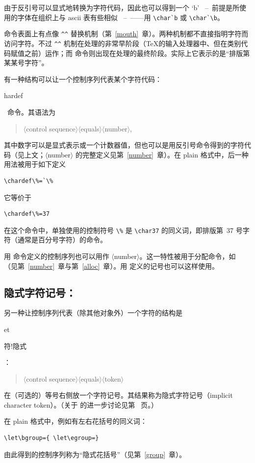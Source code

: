 \documentclass[a4paper]{rapport3}
\makeatletter
\def\gr#1{$\langle$#1$\rangle$}\def\key#1{{\tt#1}}
\def\ldash{\unskip\ --\nobreak\ \ignorespaces}
\def\rdash{\unskip\nobreak\ --\ \ignorespaces}
\def\ascii{{\sc ascii}}
\newenvironment{disp}{\begin{quotation}}{\end{quotation}}
\def\gram#1{\gr{#1}}%
\def\term#1\par{\index{#1}}
\def\cstoidx#1\par{\index{#1@\cs{#1}}}
\makeatother
\begin{document}
由于反引号可以显式地转换为字符代码，因此也可以得到一个 `b' \ldash 前提是所使用的字体在组织上与 \ascii{} 表有些相似 \rdash——用 \verb.\char`b. 或 \verb.\char`\b.。

 命令表面上有点像 \verb-^^- 替换机制（第~\ref{mouth}~章）。两种机制都不直接指明字符而访问字符。不过 \verb-^^- 机制在处理的非常早阶段（\TeX 的输入处理器中、但在类别代码赋值之前）运作；而  命令则出现在处理的最终阶段。实际上它表示的是“排版第某某号字符”。
\awp

有一种结构可以让一个控制序列代表某个字符代码：\cstoidx chardef\par\ 命令。其语法为 \label{chardef}
\begin{disp}\gram{control sequence}\gr{equals}\gram{number},
\end{disp}
其中数字可以是显式表示或一个计数器值，但也可以是用反引号命令得到的字符代码（见上文；\gr{number} 的完整定义见第~\ref{number}~章）。在 plain 格式中，后一种用法被用于如下定义
\begin{verbatim}
\chardef\%=`\%
\end{verbatim}
它等价于
\begin{verbatim}
\chardef\%=37
\end{verbatim}
在这个命令中，单独使用的控制符号 \verb>\%> 是 \verb>\char37> 的同义词，即排版第~37 号字符（通常是百分号字符）的命令。

用  命令定义的控制序列也可以用作 \gr{number}。这一特性被用于分配命令，如 （见第~\ref{number}~章与第~\ref{alloc}~章）。用  定义的记号也可以这样使用。

\subsection{隐式字符记号：\protect{}}

另一种让控制序列代表（除其他对象外）一个字符的结构是~\cstoidx let\par
\term 字符!隐式\par：
\begin{disp}\gr{control sequence}\gr{equals}\gr{token}\end{disp}
在（可选的）等号右侧放一个字符记号。其结果称为隐式字符记号（implicit character token）。（关于  的进一步讨论见第~\pageref{let} 页。）

在 plain 格式中，例如有左右花括号的同义词：
\begin{verbatim}
\let\bgroup={ \let\egroup=}
\end{verbatim}
由此得到的控制序列称为“隐式花括号”（见第~\ref{group}~章）。
\end{document}
